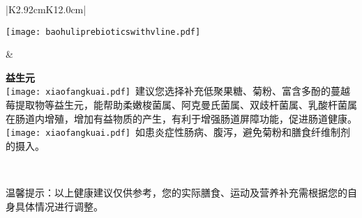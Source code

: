 \begin{center}
\begin{tabular}{|K{2.92cm}K{12.0cm}|}
\parbox[c][4.7cm]{.95\hsize}{
\noindent
\texttt{[image: baohuliprebioticswithvline.pdf]}
}
 &
\hspace*{4mm}
\parbox{.95\hsize}{
\vspace*{3mm}
\begin{spacing}{1.5}
{\fontsize{9pt}{10pt}\selectfont\bf 益生元\\}
{\texttt{[image: xiaofangkuai.pdf]}\fontsize{8pt}{10pt}\selectfont \ 建议您选择补充低聚果糖、菊粉、富含多酚的蔓越莓提取物等益生元，能帮助柔嫩梭菌属、阿克曼氏菌属、双歧杆菌属、乳酸杆菌属在肠道内增殖，增加有益物质的产生，有利于增强肠道屏障功能，促进肠道健康。\\}
{\texttt{[image: xiaofangkuai.pdf]}\fontsize{8pt}{10pt}\selectfont \ 如患炎症性肠病、腹泻，避免菊粉和膳食纤维制剂的摄入。\\}
\end{spacing}
} \\
\hline

\end{tabular}
\end{center}

{\noindent\qihao *温馨提示：以上健康建议仅供参考，您的实际膳食、运动及营养补充需根据您的自身具体情况进行调整。}
\vspace*{1cm}


